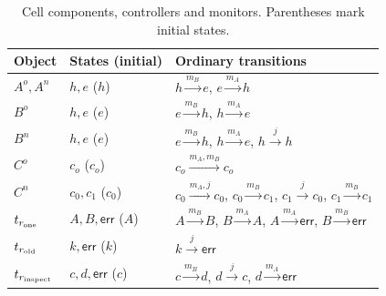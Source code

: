 \begin{table}[!htbp]
\caption{Cell components, controllers and monitors. Parentheses mark initial states.}
\label{tab:cell-automata}
\centering\small
\begin{tabular}{@{}p{.16\linewidth}p{.20\linewidth}p{.58\linewidth}@{}}\toprule
Object & States (initial) & Ordinary transitions\\\midrule
$A^o,A^n$ & $h,e$ ($h$) & $h\xrightarrow{m_B}e$, $e\xrightarrow{m_A}h$\\
$B^o$ & $h,e$ ($e$) & $e\xrightarrow{m_B}h$, $h\xrightarrow{m_A}e$\\
$B^n$ & $h,e$ ($e$) & $e\xrightarrow{m_B}h$, $h\xrightarrow{m_A}e$, $h\xrightarrow{j}h$\\
$C^o$ & $c_o$ ($c_o$) & $c_o\xrightarrow{m_A,m_B}c_o$\\
$C^n$ & $c_0,c_1$ ($c_0$) & $c_0\xrightarrow{m_A,j}c_0$, $c_0\xrightarrow{m_B}c_1$, $c_1\xrightarrow{j}c_0$, $c_1\xrightarrow{m_B}c_1$\\\midrule
$t_{r_{\rm one}}$ & $A,B,\mathsf{err}$ ($A$) & $A\xrightarrow{m_B}B$, $B\xrightarrow{m_A}A$, $A\xrightarrow{m_A}\mathsf{err}$, $B\xrightarrow{m_B}\mathsf{err}$\\
$t_{r_{\rm old}}$ & $k,\mathsf{err}$ ($k$) & $k\xrightarrow{j}\mathsf{err}$\\
$t_{r_{\rm inspect}}$ & $c,d,\mathsf{err}$ ($c$) & $c\xrightarrow{m_B}d$, $d\xrightarrow{j}c$, $d\xrightarrow{m_A}\mathsf{err}$\\\bottomrule
\end{tabular}
\end{table}
